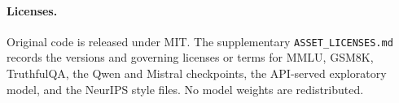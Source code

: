 \documentclass{article}
\begin{document}
\paragraph{Licenses.}
Original code is released under MIT. The supplementary
\texttt{ASSET\_LICENSES.md} records the versions and governing licenses or
terms for MMLU, GSM8K, TruthfulQA, the Qwen and Mistral checkpoints, the
API-served exploratory model, and the NeurIPS style files. No model weights are
redistributed.
\end{document}

